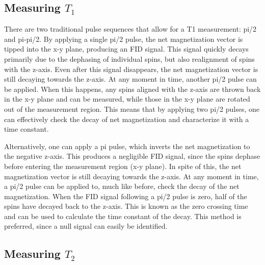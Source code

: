 \documentclass[%
 reprint,
 amsmath,amssymb,
 aps,
]{revtex4-2}
\begin{document}
\subsection{Measuring $T_1$ \label{sec:measure-t1}}

There are two traditional pulse sequences that allow for a T1 measurement: pi/2 and pi-pi/2. By applying a single pi/2 pulse, the net magnetization vector is tipped into the x-y plane, producing an FID signal. This signal quickly decays primarily due to the dephasing of individual spins, but also realignment of spins with the z-axis. Even after this signal disappears, the net magnetization vector is still decaying towards the z-axis. At any moment in time, another pi/2 pulse can be applied. When this happens, any spins aligned with the z-axis are thrown back in the x-y plane and can be measured, while those in the x-y plane are rotated out of the measurement region. This means that by applying two pi/2 pulses, one can effectively check the decay of net magnetization and characterize it with a time constant. 

Alternatively, one can apply a pi pulse, which inverts the net magnetization to the negative z-axis. This produces a negligible FID signal, since the spins dephase before entering the measurement region (x-y plane). In spite of this, the net magnetization vector is still decaying towards the z-axis. At any moment in time, a pi/2 pulse can be applied to, much like before, check the decay of the net magnetization. When the FID signal following a pi/2 pulse is zero, half of the spins have decayed back to the z-axis. This is known as the zero crossing time and can be used to calculate the time constant of the decay. This method is preferred, since a null signal can easily be identified. 


\subsection{Measuring $T_2$\label{sec:measure-t2}}
\end{document}
